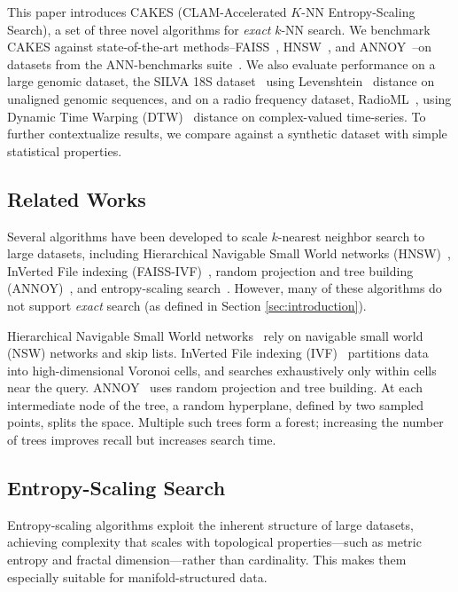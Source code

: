 This paper introduces CAKES (CLAM-Accelerated $K$-NN Entropy-Scaling Search), a set of three novel algorithms for \emph{exact} $k$-NN search.
We benchmark CAKES against state-of-the-art methods--FAISS~\cite{johnson2019billion}, HNSW~\cite{malkov2016hnsw}, and ANNOY~\cite{annoy}--on datasets from the ANN-benchmarks suite~\cite{aumuller2020ann}.
We also evaluate performance on a large genomic dataset, the SILVA 18S dataset~\cite{10.1093/nar/gks1219} using Levenshtein~\cite{levenshtein1966binary} distance on unaligned genomic sequences, and on a radio frequency dataset, RadioML~\cite{oshea2018radioml}, using Dynamic Time Warping (DTW)~\cite{gold2018dynamic} distance on complex-valued time-series.
To further contextualize results, we compare against a synthetic dataset with simple statistical properties.


\subsection{Related Works}
\label{sec:intoduction:related-works}

Several algorithms have been developed to scale $k$-nearest neighbor search to large datasets, including Hierarchical Navigable Small World networks (HNSW)~\cite{malkov2016hnsw}, InVerted File indexing (FAISS-IVF)~\cite{faissivf}, random projection and tree building (ANNOY)~\cite{annoy}, and entropy-scaling search~\cite{yu2015entropy, ishaq2019clustered}. However, many of these algorithms do not support \emph{exact} search (as defined in Section \ref{sec:introduction}).

Hierarchical Navigable Small World networks~\cite{malkov2016hnsw} rely on navigable small world (NSW) networks and skip lists. InVerted File indexing (IVF)~\cite{faissivf, sacks1987multikey, kent1990signature} partitions data into high-dimensional Voronoi cells, and searches exhaustively only within cells near the query. ANNOY~\cite{annoy} uses random projection and tree building.
At each intermediate node of the tree, a random hyperplane, defined by two sampled points, splits the space.  Multiple such trees form a forest; increasing the number of trees improves recall but increases search time.


\subsection{Entropy-Scaling Search}
\label{sec:intoduction:entropy-scaling-search}

Entropy-scaling algorithms exploit the inherent structure of large datasets, achieving complexity that scales with topological properties—such as metric entropy and fractal dimension—rather than cardinality. This makes them especially suitable for manifold-structured data.

